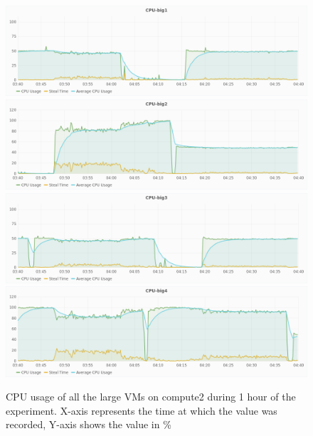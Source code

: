 \begin{figure}[!htbp]
  \centering
  \includegraphics[width=\textwidth]{cpu-big1.png}
  \includegraphics[width=\textwidth]{cpu-big2.png}
  \includegraphics[width=\textwidth]{cpu-big3.png}
  \includegraphics[width=\textwidth]{cpu-big4.png}
  \caption{CPU usage of all the large VMs on compute2 during 1 hour of the experiment. X-axis represents the time at which the value was recorded, Y-axis shows the value in \%}\label{fig:cpu-large}
\end{figure}

